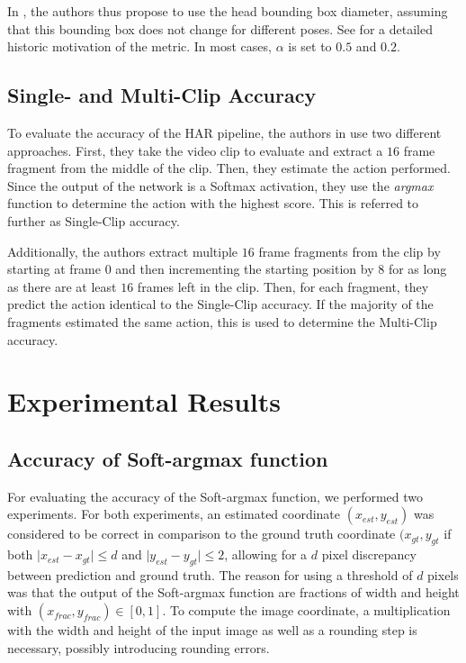 In \cite{andriluka_2d_2014}, the authors thus propose to use the head bounding box diameter, assuming that this bounding box does not change for different poses.
See  for a detailed historic motivation of the metric.
In most cases, $\alpha$ is set to $0.5$ and $0.2$.

\subsection{Single- and Multi-Clip Accuracy}
To evaluate the accuracy of the HAR pipeline, the authors in \cite{luvizon_2d/3d_2018} use two different approaches.
First, they take the video clip to evaluate and extract a $16$ frame fragment from the middle of the clip.
Then, they estimate the action performed.
Since the output of the network is a Softmax activation, they use the \textit{argmax} function to determine the action with the highest score.
This is referred to further as Single-Clip accuracy.

Additionally, the authors extract multiple $16$ frame fragments from the clip by starting at frame $0$ and then incrementing the starting position by $8$ for as long as there are at least $16$ frames left in the clip.
Then, for each fragment, they predict the action identical to the Single-Clip accuracy.
If the majority of the fragments estimated the same action, this is used to determine the Multi-Clip accuracy. 

\section{Experimental Results}
\subsection{Accuracy of Soft-argmax function}
For evaluating the accuracy of the Soft-argmax function, we performed two experiments.
For both experiments, an estimated coordinate $(x_{est},y_{est})$ was considered to be correct in comparison to the ground truth coordinate $(x_{gt}, y_{gt}$ if both $\lvert x_{est} - x_{gt} \rvert \leq d$ and $\lvert y_{est} - y_{gt} \rvert \leq 2$, allowing for a $d$ pixel discrepancy between prediction and ground truth.
The reason for using a threshold of $d$ pixels was that the output of the Soft-argmax function are fractions of width and height with $(x_{frac}, y_{frac}) \in [0,1]$.
To compute the image coordinate, a multiplication with the width and height of the input image as well as a rounding step is necessary, possibly introducing rounding errors.

